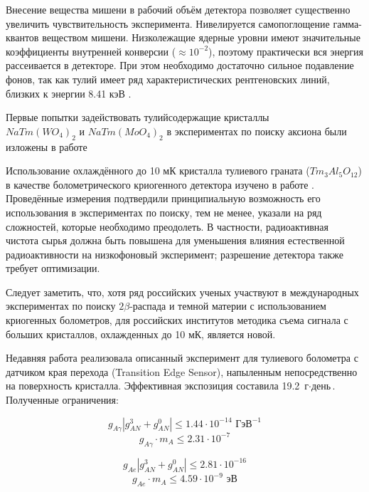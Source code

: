 \documentclass[a4paper,article,14pt]{extarticle}
\begin{document}
Внесение вещества мишени в рабочий объём детектора позволяет существенно увеличить чувствительность эксперимента. Нивелируется самопоглощение гамма-квантов веществом мишени. Низколежащие ядерные уровни имеют значительные коэффициенты внутренней конверсии  ($\approx 10^{-2}$), поэтому практически вся энергия рассеивается в детекторе. При этом необходимо достаточно сильное подавление фонов, так как тулий имеет ряд характеристических рентгеновских линий, близких к энергии 8.41 кэВ \cite{Derbin2009}.

Первые попытки задействовать тулийсодержащие кристаллы \\ $NaTm{\left( {W{O_4}} \right)_2}$ и $NaTm{\left( {Mo{O_4}} \right)_2}$ в экспериментах по поиску аксиона были изложены в работе \cite{tm_first}

Использование охлаждённого до 10 мК кристалла тулиевого граната ($Tm_3Al_5O_{12}$) в качестве болометрического криогенного детектора изучено в работе \cite{test_bolometric_tm}. Проведённые измерения подтвердили принципиальную возможность его использования в экспериментах по поиску, тем не менее, указали на ряд сложностей, которые необходимо преодолеть. В частности, радиоактивная чистота сырья должна быть повышена для уменьшения влияния естественной радиоактивности на низкофоновый эксперимент; разрешение детектора также требует оптимизации.

Следует заметить, что, хотя ряд российских ученых участвуют в международных экспериментах по поиску $2\beta$-распада и темной материи с использованием криогенных болометров, для российских институтов методика съема сигнала с больших кристаллов, охлажденных до 10 мК, является новой.

Недавняя работа \cite{newlimits_tm} реализовала описанный эксперимент для тулиевого болометра с датчиком края перехода (Transition Edge Sensor), напыленным непосредственно на поверхность кристалла. Эффективная экспозиция составила 19.2 $\text{г} \cdot \text{день}$. Полученные ограничения:

\begin{equation}
    {g_{A\gamma }}\left| {g_{AN}^3 + g_{AN}^0} \right| \leqslant 1.44 \cdot {10^{ - 14}} \text{ ГэВ}^{-1}
\end{equation}
\begin{equation}
{g_{A\gamma }} \cdot {m_A} \leqslant 2.31 \cdot {10^{ - 7}}
\end{equation}

\begin{equation}
    {g_{Ae }}\left| {g_{AN}^3 + g_{AN}^0} \right| \leqslant 2.81 \cdot {10^{ - 16}}
\end{equation}
\begin{equation}
{g_{Ae }} \cdot {m_A} \leqslant 4.59 \cdot {10^{ - 9}} \text{ эВ}
\end{equation}
\end{document}
